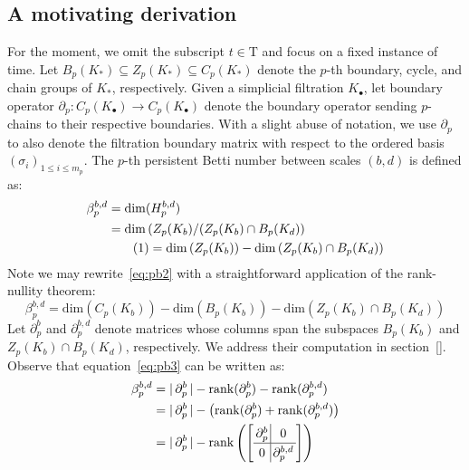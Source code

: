 \documentclass[10pt]{article}
\newcommand\numberthis{\addtocounter{equation}{1}\tag{\theequation}}
\begin{document}
\subsection*{A motivating derivation}
For the moment, we omit the subscript $t \in \mathrm{T}$ and focus on a fixed instance of time. Let $B_p(K_\ast) \subseteq Z_p(K_\ast) \subseteq C_p(K_\ast)$ denote the $p$-th boundary, cycle, and chain groups of $K_\ast$, respectively. 
Given a simplicial filtration $K_{\bullet}$, let boundary operator $\partial_p : C_p( K_{\bullet}) \to C_p(K_{\bullet})$ denote the boundary operator sending $p$-chains to their respective boundaries. 
With a slight abuse of notation, we use $\partial_p$ to also denote the filtration boundary matrix with respect to the ordered basis $(\sigma_i)_{1 \leq i \leq m_p}$.  
The $p$-th persistent Betti number between scales $(b,d)$ is defined as: 
\begin{align*}
	\beta_p^{b,d} &= \mathrm{dim}(H_p^{b,d}) \\
	&= \mathrm{dim} \left( Z_p(K_b) / (Z_p(K_b) \cap B_p(K_d) \right) \\
	& \numberthis = \mathrm{dim} \left( Z_p(K_b) \right) - \mathrm{dim}\left( Z_p(K_b) \cap B_p(K_d) \right ) \label{eq:pb2}
\end{align*}
Note we may rewrite~\eqref{eq:pb2} with a straightforward application of the rank-nullity theorem:
\begin{equation} \label{eq:pb3}
\beta_p^{b,d} = \mathrm{dim} \left( C_p(K_b) \right) - \mathrm{dim} \left( B_p(K_b) \right) - \mathrm{dim}\left( Z_p(K_b) \cap B_p(K_d) \right )  
\end{equation}
Let $\partial_p^{b}$ and $\partial_p^{b, d}$ denote matrices whose columns span the subspaces $B_p(K_b)$ and $Z_p(K_b) \cap B_p(K_d)$, respectively. We address their computation in section~\eqref{}. Observe that equation~\eqref{eq:pb3} can be written as: 
\begin{align}
	\beta_p^{b,d} &= \lvert \, \partial_p^b \, \rvert - \mathrm{rank}(\partial_p^b) - \mathrm{rank}(\partial_p^{b,d}) \\
	&= \lvert \, \partial_p^b \, \rvert - \left( \mathrm{rank}(\partial_p^b) + \mathrm{rank}(\partial_p^{b,d}) \right) \\
	&=
	\lvert \, \partial_p^b \, \rvert - 
	\arraycolsep=1.8pt\def\arraystretch{1.25}
	\mathrm{rank}\left(\left[\begin{array}{c|c}
 		\partial_p^{b} & 0 \\
		\hline
		0 & \partial_p^{b,d}
	\end{array}\right] \right) \label{eq:block_pb}
\end{align}
\end{document}
